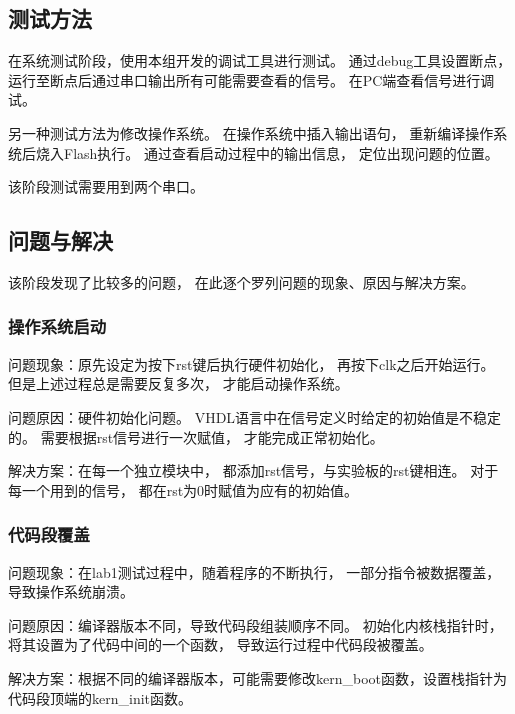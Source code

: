     \subsection{测试方法}
        在系统测试阶段，使用本组开发的调试工具进行测试。%
        通过debug工具设置断点，%
        运行至断点后通过串口输出所有可能需要查看的信号。%
        在PC端查看信号进行调试。

        另一种测试方法为修改操作系统。%
        在操作系统中插入输出语句，%
        重新编译操作系统后烧入Flash执行。%
        通过查看启动过程中的输出信息，%
        定位出现问题的位置。%
        
        该阶段测试需要用到两个串口。

    \subsection{问题与解决}
        该阶段发现了比较多的问题，%
        在此逐个罗列问题的现象、原因与解决方案。%

        \subsubsection{操作系统启动}
            问题现象：原先设定为按下rst键后执行硬件初始化，%
            再按下clk之后开始运行。%
            但是上述过程总是需要反复多次，%
            才能启动操作系统。

            问题原因：硬件初始化问题。%
            VHDL语言中在信号定义时给定的初始值是不稳定的。%
            需要根据rst信号进行一次赋值，%
            才能完成正常初始化。

            解决方案：在每一个独立模块中，%
            都添加rst信号，与实验板的rst键相连。%
            对于每一个用到的信号，%
            都在rst为0时赋值为应有的初始值。

        \subsubsection{代码段覆盖}
            问题现象：在lab1测试过程中，随着程序的不断执行，%
            一部分指令被数据覆盖，导致操作系统崩溃。

            问题原因：编译器版本不同，导致代码段组装顺序不同。%
            初始化内核栈指针时，将其设置为了代码中间的一个函数，%
            导致运行过程中代码段被覆盖。

            解决方案：根据不同的编译器版本，可能需要修改kern\_boot函数，设置栈指针为代码段顶端的kern\_init函数。


